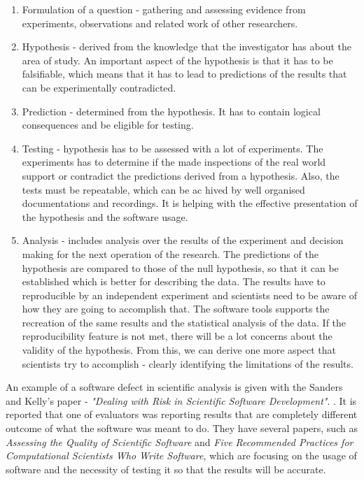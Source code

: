 \begin{enumerate}
\item Formulation of a question - gathering and assessing evidence from experiments, observations and related work of other researchers.

\item Hypothesis - derived from the knowledge that the investigator has about the area of study. An important aspect of the hypothesis is that it has to be falsifiable, which means that it has to lead to predictions of the results that can be experimentally contradicted. 

\item Prediction - determined from the hypothesis. It has to contain logical consequences and be eligible for testing.

\item Testing - hypothesis has to be assessed with a lot of experiments. The experiments has to determine if the made inspections of the real world support or contradict the predictions derived from a hypothesis. Also, the tests must be repeatable, which can be ac hived by well organised documentations and recordings. It is helping with the effective presentation of the hypothesis and the software usage.

\item Analysis - includes analysis over the results of the experiment and decision making for the next operation of the research. The predictions of the hypothesis are compared to those of the null hypothesis, so that it can be established which is better for describing the data. The results have to reproducible by an independent experiment and scientists need to be aware of how they are going to accomplish that. The software tools supports the recreation of the same results and the statistical analysis of the data. If the reproducibility feature is not met, there will be a lot concerns about the validity of the hypothesis. From this, we can derive one more aspect that scientists try to accomplish - clearly identifying the limitations of the results.

\end{enumerate}

An example of a software defect in scientific analysis is given with the Sanders and Kelly's paper - \textit{"Dealing with Risk in Scientific Software Development"}. \cite{sanders2008dealing}. It is reported that one of evaluators was reporting results that are completely different outcome of what the software was meant to do. They have several papers, such as \textit{Assessing the Quality of Scientific Software} and \textit{Five Recommended Practices
for Computational Scientists Who Write Software}, which are focusing on the usage of software and the necessity of testing it so that the results will be accurate. \cite{kellyassessing}\cite{kelly2009five} 

